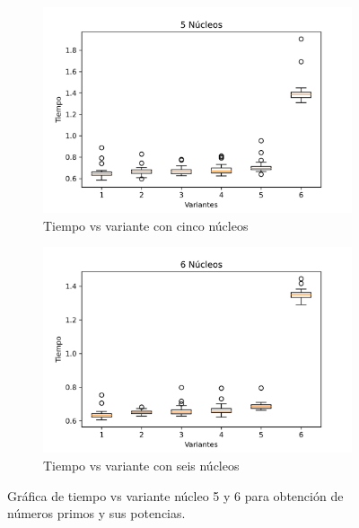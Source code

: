 \documentclass{article}
\begin{document}
\begin{figure}[H]
\centering
\begin{subfigure}[b]{0.45\linewidth}
\includegraphics[width=\linewidth]{G_tiempo_5.png}
\caption{Tiempo vs variante con cinco núcleos}
\end{subfigure}
\begin{subfigure}[b]{0.45\linewidth}
\includegraphics[width=\linewidth]{G_tiempo_6.png}
\caption{Tiempo vs variante con seis núcleos}
\end{subfigure}
\caption{Gráfica de tiempo vs variante núcleo 5 y 6 para obtención de números primos y sus potencias.}
\label{fig:westminster}
\end{figure}
\end{document}
